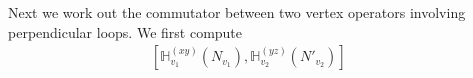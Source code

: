 \documentclass[12pt]{article}
\newcommand{\nn}{\nonumber}
\def\cl{{\cal L}}
\begin{document}
\begin{appendix}
Next we work out the commutator between two vertex operators involving perpendicular loops. We first compute
\begin{eqnarray}
\left[\mathds{H}^{(xy)}_{v_1}(N_{v_1}),\mathds{H}^{(yz)}_{v_2}(N'_{v_2})\right] &&\nn\\

\end{eqnarray}
\end{appendix}
\end{document}
